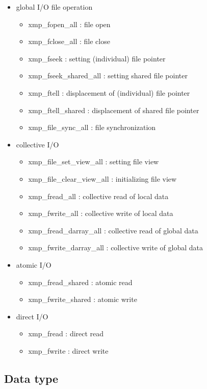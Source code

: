    \begin{itemize}
    \item global I/O file operation
    \begin{itemize}
     \item xmp\_fopen\_all : file open
     \item xmp\_fclose\_all : file close
     \item xmp\_fseek : setting (individual) file pointer
     \item xmp\_fseek\_shared\_all : setting shared file pointer
     \item xmp\_ftell : displacement of (individual) file pointer
     \item xmp\_ftell\_shared : displacement of shared file pointer
     \item xmp\_file\_sync\_all : file synchronization
    \end{itemize}
    \item collective I/O
    \begin{itemize}
     \item xmp\_file\_set\_view\_all : setting file view
     \item xmp\_file\_clear\_view\_all : initializing file view
     \item xmp\_fread\_all : collective read of local data
     \item xmp\_fwrite\_all : collective write of local data
     \item xmp\_fread\_darray\_all : collective read of global data
     \item xmp\_fwrite\_darray\_all : collective write of global data
    \end{itemize}
    \item atomic I/O
    \begin{itemize}
     \item xmp\_fread\_shared : atomic read
     \item xmp\_fwrite\_shared : atomic write
    \end{itemize}
    \item direct I/O
    \begin{itemize}
     \item xmp\_fread : direct read
     \item xmp\_fwrite : direct write
    \end{itemize}
   \end{itemize}

   
   \subsection*{Data type}


